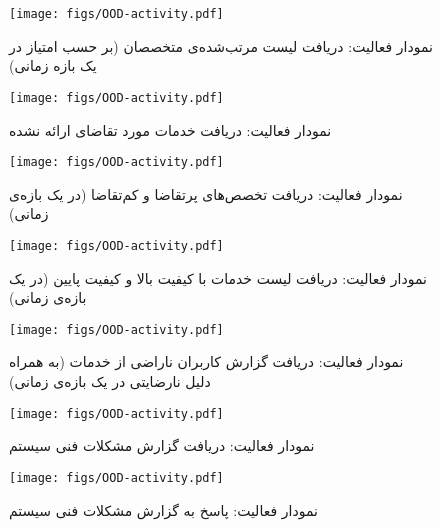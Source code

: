 \begin{figure}
	\centering
	\texttt{[image: figs/OOD-activity.pdf]}
	\caption{نمودار فعالیت: دریافت لیست مرتب‌شده‌ی متخصصان (بر حسب امتیاز در یک بازه زمانی)}
\end{figure}
\FloatBarrier
\newpage

\begin{figure}
	\centering
	\texttt{[image: figs/OOD-activity.pdf]}
	\caption{نمودار فعالیت: ‌دریافت خدمات مورد تقاضای ارائه نشده}
\end{figure}
\FloatBarrier
\newpage

\begin{figure}
	\centering
	\texttt{[image: figs/OOD-activity.pdf]}
	\caption{نمودار فعالیت: دریافت تخصص‌های پرتقاضا و کم‌تقاضا (در یک بازه‌ی زمانی)}
\end{figure}
\FloatBarrier
\newpage

\begin{figure}
	\centering
	\texttt{[image: figs/OOD-activity.pdf]}
	\caption{نمودار فعالیت: دریافت لیست خدمات با کیفیت بالا و کیفیت پایین (در یک بازه‌ی زمانی)}
\end{figure}
\FloatBarrier
\newpage

\begin{figure}
	\centering
	\texttt{[image: figs/OOD-activity.pdf]}
	\caption{نمودار فعالیت: دریافت گزارش کاربران ناراضی از خدمات (به همراه دلیل نارضایتی  در یک بازه‌ی زمانی)}
\end{figure}
\FloatBarrier
\newpage

\begin{figure}
	\centering
	\texttt{[image: figs/OOD-activity.pdf]}
	\caption{نمودار فعالیت: دریافت گزارش مشکلات فنی سیستم}
\end{figure}
\FloatBarrier
\newpage

\begin{figure}
	\centering
	\texttt{[image: figs/OOD-activity.pdf]}
	\caption{نمودار فعالیت: پاسخ به گزارش مشکلات فنی سیستم}
\end{figure}
\FloatBarrier
\newpage
